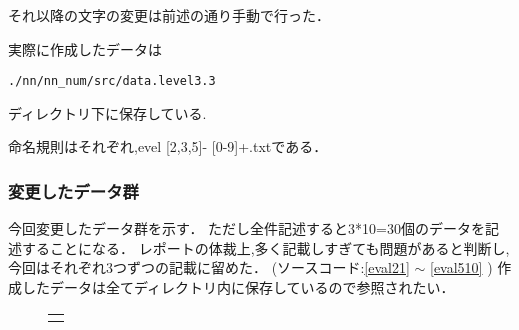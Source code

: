 それ以降の文字の変更は前述の通り手動で行った．

実際に作成したデータは
\begin{oframed}
\begin{verbatim}
./nn/nn_num/src/data.level3.3
\end{verbatim}
\end{oframed}
ディレクトリ下に保存している.

命名規則はそれぞれ,evel [2,3,5]- [0-9]+.txtである．

\subsubsection{変更したデータ群}
今回変更したデータ群を示す．
ただし全件記述すると3*10=30個のデータを記述することになる．
レポートの体裁上,多く記載しすぎても問題があると判断し,今回はそれぞれ3つずつの記載に留めた． (ソースコード:\ref{eval21} $\sim$ \ref{eval510} )
作成したデータは全てディレクトリ内に保存しているので参照されたい．

\begin{figure}[H]
    \begin{center}
        \begin{tabular}{c}

            \begin{minipage}{0.33\hsize}
                \begin{center}
                
                \end{center}
                \end{minipage}

                \begin{minipage}{0.33\hsize}
                    \begin{center}
                        
                    \end{center}
                    \end{minipage}
                \begin{minipage}{0.33\hsize}
                    \begin{center}
                        
                    \end{center}
                    \end{minipage}
        \end{tabular}
\end{center}
\end{figure}

